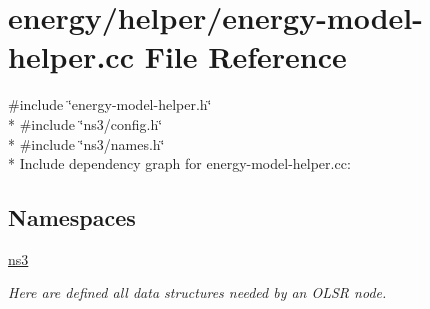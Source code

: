 \hypertarget{energy-model-helper_8cc}{}\section{energy/helper/energy-\/model-\/helper.cc File Reference}
\label{energy-model-helper_8cc}
{\ttfamily \#include \char`\"{}energy-\/model-\/helper.\+h\char`\"{}}\\*
{\ttfamily \#include \char`\"{}ns3/config.\+h\char`\"{}}\\*
{\ttfamily \#include \char`\"{}ns3/names.\+h\char`\"{}}\\*
Include dependency graph for energy-\/model-\/helper.cc\+:
\subsection*{Namespaces}
\begin{DoxyCompactItemize}
\item 
 \hyperlink{namespacens3}{ns3}
\begin{DoxyCompactList}\small\item\em Here are defined all data structures needed by an O\+L\+SR node. \end{DoxyCompactList}\end{DoxyCompactItemize}
